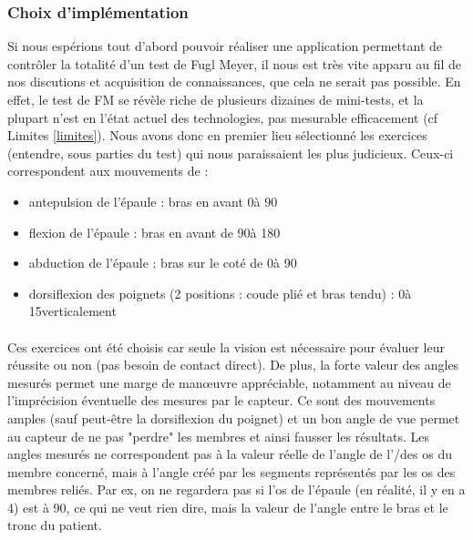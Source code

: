     
    
\subsubsection{Choix d'implémentation}
Si nous espérions tout d'abord pouvoir réaliser une application permettant de contrôler la totalité d'un test de Fugl Meyer, il nous
est très vite apparu au fil de nos discutions et acquisition de connaissances, que cela ne serait pas possible. En effet, le test de FM
se révèle riche de plusieurs dizaines de mini-tests, et la plupart n'est en l'état actuel des technologies, pas mesurable efficacement (cf Limites \ref{limites}). Nous avons donc en premier lieu sélectionné les exercices (entendre, sous parties du test)
qui nous paraissaient les plus judicieux. Ceux-ci correspondent aux mouvements de :
\begin{itemize}
\item antepulsion de l'épaule : bras en avant 0\degre à 90\degre
\item flexion de l'épaule : bras en avant de 90\degre à 180\degre
\item abduction de l'épaule : bras sur le coté de 0\degre à 90\degre
\item dorsiflexion des poignets (2 positions : coude plié et bras tendu) : 0\degre à 15\degre verticalement
\end{itemize}

\paragraph{}
Ces exercices ont été choisis car seule la vision est nécessaire pour évaluer leur réussite ou non (pas besoin de contact direct).
De plus, la forte valeur des angles mesurés permet une marge de manœuvre appréciable, notamment au niveau de l'imprécision
éventuelle des mesures par le capteur. Ce sont des mouvements amples (sauf peut-être la dorsiflexion du poignet) et un bon
angle de vue permet au capteur de ne pas "perdre" les membres et ainsi fausser les résultats. Les angles mesurés ne
correspondent pas à la valeur réelle de l'angle de l'/des os du membre concerné, mais à l'angle créé par les segments représentés par les os des membres reliés. Par ex, on ne regardera pas si l'os de l'épaule (en réalité, il y en a 4) est à 90\degre, ce qui ne veut rien dire, mais la valeur de l'angle entre le bras et le tronc du patient.

